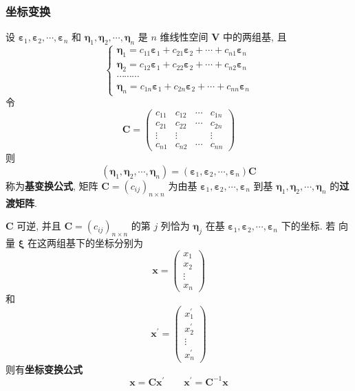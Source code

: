 \documentclass{article}
\begin{document}
			\subsubsection{坐标变换}
				设 $\boldsymbol \varepsilon_{1}, \boldsymbol \varepsilon_{2}, \cdots, \boldsymbol \varepsilon_{n}$ 和 $\boldsymbol{\eta}_{1}, \boldsymbol{\eta}_{2}, \cdots, \boldsymbol{\eta}_{n}$ 是 $n$ 维线性空间 $\boldsymbol V$ 中的两组基, 且
				$$
				\left\{\begin{array}{r}
					\boldsymbol \eta_{1}=c_{11} \boldsymbol \varepsilon_{1}+c_{21} \boldsymbol \varepsilon_{2}+\cdots+c_{n 1} \boldsymbol \varepsilon_{n} \\
					\boldsymbol \eta_{2}=c_{12} \boldsymbol \varepsilon_{1}+c_{22} \boldsymbol \varepsilon_{2}+\cdots+c_{n 2} \boldsymbol \varepsilon_{n} \\
					\cdots \cdots \cdots \\
					\boldsymbol \eta_{n}=c_{1 n} \boldsymbol \varepsilon_{1}+c_{2 n} \boldsymbol \varepsilon_{2}+\cdots+c_{n n} \boldsymbol \varepsilon_{n}
				\end{array}\right.
				$$
				令
				$$
				\boldsymbol{C}=\left(\begin{array}{rrrr}
					c_{11} & c_{12} & \cdots & c_{1 n} \\
					c_{21} & c_{22} & \cdots & c_{2 n} \\
					\vdots & \vdots & & \vdots \\
					c_{n 1} & c_{n 2} & \cdots & c_{n n}
				\end{array}\right)
				$$
				则
				$$
				\left(\boldsymbol{\eta}_{1}, \boldsymbol{\eta}_{2}, \cdots, \boldsymbol{\eta}_{n}\right)=\left(\boldsymbol \varepsilon_{1}, \boldsymbol \varepsilon_{2}, \cdots, \boldsymbol \varepsilon_{n}\right) \boldsymbol{C}
				$$
				称为\textbf{基变换公式}, 矩阵 $\boldsymbol{C}=\left(c_{i j}\right)_{n \times n}$ 为由基 $\boldsymbol \varepsilon_{1}, \boldsymbol \varepsilon_{2}, \cdots, \boldsymbol \varepsilon_{n}$ 到基 $\boldsymbol{\eta}_{1}, \boldsymbol{\eta}_{2}, \cdots, \boldsymbol{\eta}_{n}$ 的\textbf{过渡矩阵}.

				$\boldsymbol{C}$ 可逆, 并且 $\boldsymbol{C}=\left(c_{i j}\right)_{n \times n}$ 的第 $j$ 列恰为 $\boldsymbol{\eta}_{j}$ 在基 $\boldsymbol \varepsilon_{1}, \boldsymbol \varepsilon_{2}, \cdots, \boldsymbol \varepsilon_{n}$ 下的坐标.
				若
				向量 $\boldsymbol{\xi}$ 在这两组基下的坐标分别为
				$$
				\boldsymbol{x}=\left(\begin{array}{c}
					x_{1} \\
					x_{2} \\
					\vdots \\
					x_{n}
				\end{array}\right)
				$$
				和
				$$
				\boldsymbol{x}^{\prime}=\left(\begin{array}{c}
					x_{1}^{\prime} \\
					x_{2}^{\prime} \\
					\vdots \\
					x_{n}^{\prime}
				\end{array}\right)
				$$
				则有\textbf{坐标变换公式}
				$$
				\boldsymbol x = \boldsymbol C {\boldsymbol x}^{\prime}\qquad{\boldsymbol x}^{\prime} = \boldsymbol C^{-1} \boldsymbol x
				$$
\end{document}
